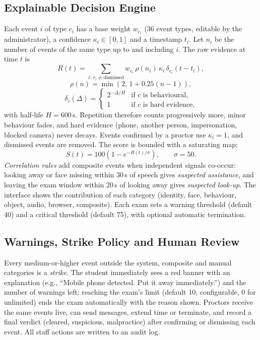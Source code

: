 \documentclass[conference]{IEEEtran}
\begin{document}
\subsection{Explainable Decision Engine}
Each event $i$ of type $c_i$ has a base weight $w_{c_i}$ (36 event types, editable by the administrator), a confidence $\kappa_i\in[0,1]$ and a timestamp $t_i$. Let $n_i$ be the number of events of the same type up to and including $i$. The raw evidence at time $t$ is
\begin{equation}
R(t)=\sum_{i:\,r_i\neq\text{dismissed}} w_{c_i}\,\rho(n_i)\,\kappa_i\,\delta_{c_i}(t-t_i),
\end{equation}
\begin{equation}
\rho(n)=\min\!\left(2,\,1+0.25(n-1)\right),
\end{equation}
\begin{equation}
\delta_c(\Delta)=\begin{cases}2^{-\Delta/H} & \text{if } c \text{ is behavioural,}\\ 1 & \text{if } c \text{ is hard evidence,}\end{cases}
\end{equation}
with half-life $H=600$\,s. Repetition therefore counts progressively more, minor behaviour fades, and hard evidence (phone, another person, impersonation, blocked camera) never decays. Events confirmed by a proctor use $\kappa_i=1$, and dismissed events are removed. The score is bounded with a saturating map:
\begin{equation}
S(t)=100\left(1-e^{-R(t)/\sigma}\right),\qquad \sigma=50.
\end{equation}
\emph{Correlation rules} add composite events when independent signals co-occur: looking away or face missing within 30\,s of speech gives \emph{suspected assistance}, and leaving the exam window within 20\,s of looking away gives \emph{suspected look-up}. The interface shows the contribution of each category (identity, face, behaviour, object, audio, browser, composite). Each exam sets a warning threshold (default 40) and a critical threshold (default 75), with optional automatic termination.

\subsection{Warnings, Strike Policy and Human Review}
Every medium-or-higher event outside the system, composite and manual categories is a \emph{strike}. The student immediately sees a red banner with an explanation (e.g., ``Mobile phone detected. Put it away immediately.'') and the number of warnings left; reaching the exam's limit (default 10, configurable, 0 for unlimited) ends the exam automatically with the reason shown. Proctors receive the same events live, can send messages, extend time or terminate, and record a final verdict (cleared, suspicious, malpractice) after confirming or dismissing each event. All staff actions are written to an audit log.
\end{document}
